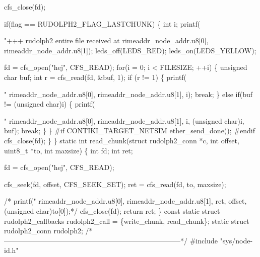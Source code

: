 \begin{DoxyCodeInclude}
{{{  cfs\_close(fd);

  \textcolor{keywordflow}{if}(flag == RUDOLPH2\_FLAG\_LASTCHUNK) \{
    \textcolor{keywordtype}{int} i;
    printf(\textcolor{stringliteral}{"+++ rudolph2 entire file received at %
           rimeaddr\_node\_addr.u8[0], rimeaddr\_node\_addr.u8[1]);
    leds\_off(LEDS\_RED);
    leds\_on(LEDS\_YELLOW);

    fd = cfs\_open(\textcolor{stringliteral}{"hej"}, CFS\_READ);
    \textcolor{keywordflow}{for}(i = 0; i < FILESIZE; ++i) \{
      \textcolor{keywordtype}{unsigned} \textcolor{keywordtype}{char} buf;
      \textcolor{keywordtype}{int} r = cfs\_read(fd, &buf, 1);
      \textcolor{keywordflow}{if} (r != 1) \{
        printf(\textcolor{stringliteral}{"%
               rimeaddr\_node\_addr.u8[0], rimeaddr\_node\_addr.u8[1],
               i);
        \textcolor{keywordflow}{break};
      \}       
      \textcolor{keywordflow}{else} \textcolor{keywordflow}{if}(buf != (\textcolor{keywordtype}{unsigned} \textcolor{keywordtype}{char})i) \{
        printf(\textcolor{stringliteral}{"%
               rimeaddr\_node\_addr.u8[0], rimeaddr\_node\_addr.u8[1],
               i, (\textcolor{keywordtype}{unsigned} \textcolor{keywordtype}{char})i, buf);
        \textcolor{keywordflow}{break};
      \}
    \}
\textcolor{preprocessor}{#if CONTIKI\_TARGET\_NETSIM}
    ether\_send\_done();
\textcolor{preprocessor}{#endif}
    cfs\_close(fd);
  \}
\}
\textcolor{keyword}{static} \textcolor{keywordtype}{int}
read\_chunk(\textcolor{keyword}{struct} rudolph2\_conn *c, \textcolor{keywordtype}{int} offset, uint8\_t *to, \textcolor{keywordtype}{int} maxsize)
\{
  \textcolor{keywordtype}{int} fd;
  \textcolor{keywordtype}{int} ret;
  
  fd = cfs\_open(\textcolor{stringliteral}{"hej"}, CFS\_READ);

  cfs\_seek(fd, offset, CFS\_SEEK\_SET);
  ret = cfs\_read(fd, to, maxsize);
  \textcolor{comment}{/*  printf("%
\textcolor{comment}{         rimeaddr\_node\_addr.u8[0], rimeaddr\_node\_addr.u8[1],}
\textcolor{comment}{         ret, offset, (unsigned char)to[0]);*/}
  cfs\_close(fd);
  \textcolor{keywordflow}{return} ret;
\}
\textcolor{keyword}{const} \textcolor{keyword}{static} \textcolor{keyword}{struct }rudolph2\_callbacks rudolph2\_call = \{write\_chunk,
                                                        read\_chunk\};
\textcolor{keyword}{static} \textcolor{keyword}{struct }rudolph2\_conn rudolph2;
\textcolor{comment}{/*---------------------------------------------------------------------------*/}
\textcolor{preprocessor}{#include "sys/node-id.h"}

}}}}}}}
\end{DoxyCodeInclude}
